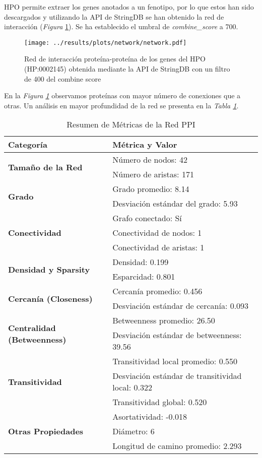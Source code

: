 HPO permite extraer los genes anotados a un fenotipo, por lo que estos han sido descargados y utilizando la API de StringDB se han obtenido la red de interacción (\textit{Figura} \ref{fig:network}).
Se ha establecido el umbral de \textit{combine\_score} a 700.

\begin{figure}[h]
	\centering
	\texttt{[image: ../results/plots/network/network.pdf]}
	\caption{Red de interacción proteína-proteína de los genes del HPO (HP:0002145) obtenida mediante la API de StringDB con un filtro de 400 del combine score}
	\label{fig:network}
\end{figure}

En la \textit{Figura \ref{fig:network}} observamos proteínas con mayor número de conexiones que a otras. 
Un análisis en mayor profundidad de la red se presenta en la \textit{Tabla \ref{tab:NetworkMetrics}}.


\begin{table}[h!]
	\centering
	\caption{Resumen de Métricas de la Red PPI}
	\label{tab:NetworkMetrics}
	\begin{tabular}{ll}
		\toprule
		\textbf{Categoría} & \textbf{Métrica y Valor} \\
		\midrule
		\multirow{2}{*}{\textbf{Tamaño de la Red}} 
		& Número de nodos: 42 \\
		& Número de aristas: 171 \\
		\midrule
		\multirow{2}{*}{\textbf{Grado}} 
		& Grado promedio: 8.14 \\
		& Desviación estándar del grado: 5.93 \\
		\midrule
		\multirow{3}{*}{\textbf{Conectividad}} 
		& Grafo conectado: Sí \\
		& Conectividad de nodos: 1 \\
		& Conectividad de aristas: 1 \\
		\midrule
		\multirow{2}{*}{\textbf{Densidad y Sparsity}} 
		& Densidad: 0.199 \\
		& Esparcidad: 0.801 \\
		\midrule
		\multirow{2}{*}{\textbf{Cercanía (Closeness)}} 
		& Cercanía promedio: 0.456 \\
		& Desviación estándar de cercanía: 0.093 \\
		\midrule
		\multirow{2}{*}{\textbf{Centralidad (Betweenness)}} 
		& Betweenness promedio: 26.50 \\
		& Desviación estándar de betweenness: 39.56 \\
		\midrule
		\multirow{3}{*}{\textbf{Transitividad}} 
		& Transitividad local promedio: 0.550 \\
		& Desviación estándar de transitividad local: 0.322 \\
		& Transitividad global: 0.520 \\
		\midrule
		\multirow{3}{*}{\textbf{Otras Propiedades}} 
		& Asortatividad: -0.018 \\
		& Diámetro: 6 \\
		& Longitud de camino promedio: 2.293 \\
		\bottomrule
	\end{tabular}
\end{table}

